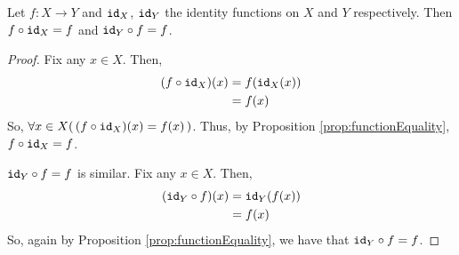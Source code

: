 \guard





\begin{prop}
\label{prop:compositionIdentity}
  Let $f:X\to Y$ and $\texttt{id}_X$, $\texttt{id}_Y$ the identity functions on $X$ and $Y$ respectively.
  Then $f\circ\texttt{id}_X=f$ and $\texttt{id}_Y\circ f = f$.
\end{prop}
\begin{proof}
  Fix any $x\in X$.
  Then,
  \begin{align*}
    (f\circ\texttt{id}_X)(x)  &= f(\texttt{id}_X(x)) \\
                      &= f(x)
  \end{align*}
  So, $\forall x\in X(\,(f\circ\texttt{id}_X)(x)=f(x)\,)$.
  Thus, by Proposition \ref{prop:functionEquality}, $f\circ\texttt{id}_X = f$.

  $\texttt{id}_Y\circ f = f$ is similar.
  Fix any $x\in X$.
  Then,
  \begin{align*}
    (\texttt{id}_Y\circ f)(x) &= \texttt{id}_Y( f(x)) \\
                      &= f(x) \\
  \end{align*}
  So, again by Proposition \ref{prop:functionEquality}, we have that $\texttt{id}_Y\circ f = f$.
\end{proof}
